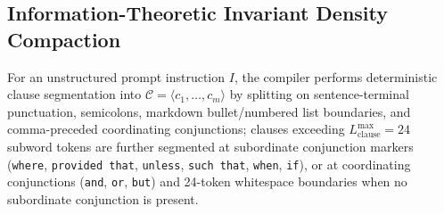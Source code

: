 \documentclass[conference,10pt]{IEEEtran}
\begin{document}
\subsection{Information-Theoretic Invariant Density Compaction}
For an unstructured prompt instruction $I$, the compiler performs deterministic clause segmentation into $\mathcal{C} = \langle c_1, \dots, c_m \rangle$ by splitting on sentence-terminal punctuation, semicolons, markdown bullet/numbered list boundaries, and comma-preceded coordinating conjunctions; clauses exceeding $L_{\text{clause}}^{\max} = 24$ subword tokens are further segmented at subordinate conjunction markers (\texttt{where}, \texttt{provided that}, \texttt{unless}, \texttt{such that}, \texttt{when}, \texttt{if}), or at coordinating conjunctions (\texttt{and}, \texttt{or}, \texttt{but}) and 24-token whitespace boundaries when no subordinate conjunction is present.
\end{document}
